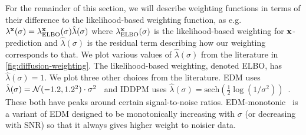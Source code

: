 For the remainder of this section, we will describe weighting functions in terms of their difference to the likelihood-based weighting function, as e.g. $\lambda^{\mathbf{x}}(\sigma) = \lambda^{\mathbf{x}}_\text{ELBO}(\sigma) \hat{\lambda}(\sigma)$ where $\lambda^{\mathbf{x}}_\text{ELBO}(\sigma)$ is the likelihood-based weighting for ${\mathbf{x}}$-prediction and $\hat{\lambda}(\sigma)$ is the residual term describing how our weighting corresponds to that. We plot various values of $\hat{\lambda}(\sigma)$ from the literature in \cref{fig:diffusion-weighting}. The likelihood-based weighting, denoted ELBO, has $\hat{\lambda}(\sigma) = 1$. We plot three other choices from the literature. EDM uses $\hat{\lambda}(\sigma) = {\mathcal{N}}(-1.2, 1.2^2) \cdot \sigma^2$~\citep{karras2022elucidating,kingma2023understanding} and IDDPM uses $\hat{\lambda}(\sigma) = \text{sech}(\frac{1}{2} \log(1/\sigma^2) )$~\citep{nichol2021improved,kingma2023understanding}. These both have peaks around certain signal-to-noise ratios. EDM-monotonic~\citep{kingma2023understanding} is a variant of EDM designed to be monotonically increasing with $\sigma$ (or decreasing with SNR) so that it always gives higher weight to noisier data.

